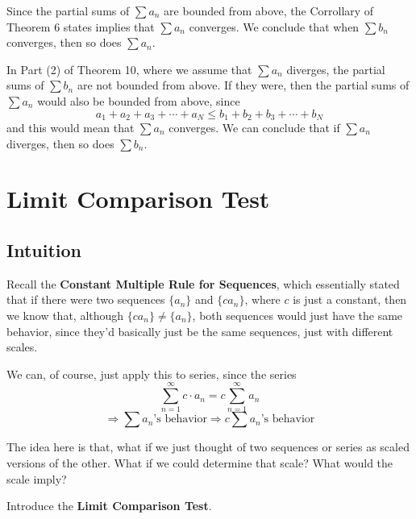 \documentclass{report}
\begin{document}
\begin{sloppypar}
Since the partial sums of $ \sum a_{n} $ are bounded
from above, the Corrollary of Theorem 6 states implies
that $ \sum a_{n} $ converges. We conclude that when
$ \sum b_{n} $ converges, then so does $ \sum a_{n} $.
\par In Part (2) of Theorem 10, where we assume that
$ \sum a_{n} $ diverges, the partial sums of $ \sum b_{n} $
are not bounded from above. If they were, then the partial
sums of $ \sum a_{n} $ would also be bounded from
above, since
\[ a_{1} + a_{2} + a_{3} + \cdots + a_{N} \leq
  b_{1} + b_{2} + b_{3} + \cdots + b_{N}\]
and this would mean that $ \sum a_{n} $ converges.
We can conclude that if $ \sum a_{n} $ diverges, then
so does $ \sum b_{n} $.
\section{Limit Comparison Test}
\subsection{Intuition}
Recall the \textbf{Constant Multiple Rule for Sequences}, which essentially
stated that if there were two sequences $ \{a_{n}\} $ and
$ \{ ca_{n}\}$, where $ c $ is just a constant, then we
know that, although $ \{ ca_{n}\} \neq \{ a_{n}\} $, both
sequences would just have the same behavior, since they'd
basically just be the same sequences, just with different
scales.

\par We can, of course, just apply this to series, since
the series
\[ \sum_{n=1}^{\infty} c \cdot a_{n} = c \sum_{n=1}^{\infty} a_{n}\]
\[ \Rightarrow \sum a_{n} \textrm{'s behavior} \Rightarrow c \sum a_{n}
\textrm{'s behavior}\]

The idea here is that, what if we just thought of
two sequences or series as scaled versions of the other. What if we
could determine that scale? What would the scale imply?

Introduce the \textbf{Limit Comparison Test}.

\begin{center}
\end{center}
\end{sloppypar}
\end{document}
